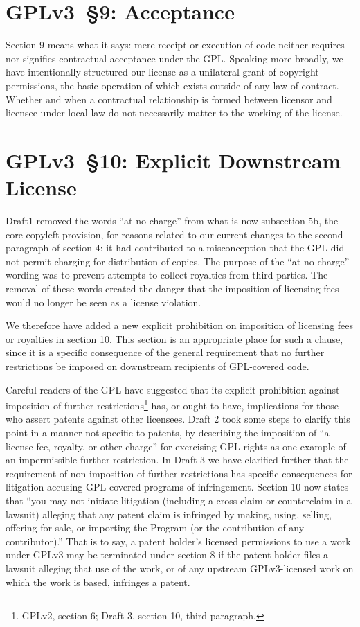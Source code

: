 \section{GPLv3~\S9: Acceptance}


Section 9 means what it says: mere receipt or execution of code neither
requires nor signifies contractual acceptance under the GPL.  Speaking more
broadly, we have intentionally structured our license as a unilateral grant
of copyright permissions, the basic operation of which exists outside of any
law of contract.  Whether and when a contractual relationship is formed
between licensor and licensee under local law do not necessarily matter to
the working of the license.

\section{GPLv3~\S10: Explicit Downstream License}


Draft1 removed the words ``at no charge'' from what is now subsection 5b, the
core copyleft provision, for reasons related to our current changes to the
second paragraph of section 4: it had contributed to a misconception that the
GPL did not permit charging for distribution of copies.  The purpose of the
``at no charge'' wording was to prevent attempts to collect royalties from
third parties.  The removal of these words created the danger that the
imposition of licensing fees would no longer be seen as a license
violation.

We therefore have added a new explicit prohibition on imposition of licensing
fees or royalties in section 10.  This section is an appropriate place for
such a clause, since it is a specific consequence of the general requirement
that no further restrictions be imposed on downstream recipients of
GPL-covered code.

Careful readers of the GPL have suggested that its explicit prohibition
against imposition of further restrictions\footnote{GPLv2, section 6; Draft
  3, section 10, third paragraph.} has, or ought to have, implications for
those who assert patents against other licensees.  Draft 2 took some steps to
clarify this point in a manner not specific to patents, by describing the
imposition of ``a license fee, royalty, or other charge'' for exercising GPL
rights as one example of an impermissible further restriction.  In Draft 3 we
have clarified further that the requirement of non-imposition of further
restrictions has specific consequences for litigation accusing GPL-covered
programs of infringement.  Section 10 now states that ``you may not initiate
litigation (including a cross-claim or counterclaim in a lawsuit) alleging
that any patent claim is infringed by making, using, selling, offering for
sale, or importing the Program (or the contribution of any contributor).''
That is to say, a patent holder's licensed permissions to use a work under
GPLv3 may be terminated under section 8 if the patent holder files a lawsuit
alleging that use of the work, or of any upstream GPLv3-licensed work on
which the work is based, infringes a patent.


